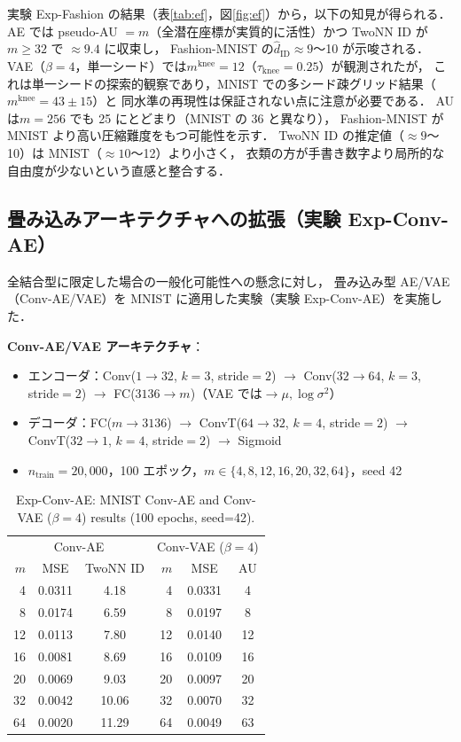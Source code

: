 \documentclass[11pt,a4paper]{jsarticle}
\newcommand{\mknee}{m^{\mathrm{knee}}}
\begin{document}
実験 Exp-Fashion の結果（表\ref{tab:ef}，図\ref{fig:ef}）から，以下の知見が得られる．
AE では pseudo-AU $= m$（全潜在座標が実質的に活性）かつ TwoNN ID が $m \geq 32$ で $\approx 9.4$ に収束し，
Fashion-MNIST の$\hat{d}_\mathrm{ID} \approx 9$〜10 が示唆される．
VAE（$\beta=4$，単一シード）では$\mknee = 12$（$\tau_{\mathrm{knee}} = 0.25$）が観測されたが，
これは単一シードの探索的観察であり，MNIST での多シード疎グリッド結果（$\mknee = 43 \pm 15$）と
同水準の再現性は保証されない点に注意が必要である．
AU は$m = 256$ でも 25 にとどまり（MNIST の 36 と異なり），
Fashion-MNIST が MNIST より高い圧縮難度をもつ可能性を示す．
TwoNN ID の推定値（$\approx 9$〜10）は MNIST（$\approx 10$〜12）より小さく，
衣類の方が手書き数字より局所的な自由度が少ないという直感と整合する．

\subsection{畳み込みアーキテクチャへの拡張（実験 Exp-Conv-AE）}\label{sec:exp_conv}

全結合型に限定した場合の一般化可能性への懸念に対し，
畳み込み型 AE/VAE（Conv-AE/VAE）を MNIST に適用した実験（実験 Exp-Conv-AE）を実施した．

\textbf{Conv-AE/VAE アーキテクチャ}：
\begin{itemize}
  \item エンコーダ：Conv($1\to32$, $k=3$, stride$=2$) $\to$ Conv($32\to64$, $k=3$, stride$=2$)
        $\to$ FC($3136\to m$)（VAE では$\to \mu, \log\sigma^2$）
  \item デコーダ：FC($m\to3136$) $\to$ ConvT($64\to32$, $k=4$, stride$=2$) $\to$
        ConvT($32\to1$, $k=4$, stride$=2$) $\to$ Sigmoid
  \item $n_{\mathrm{train}} = 20{,}000$，100 エポック，$m \in \{4, 8, 12, 16, 20, 32, 64\}$，seed 42
\end{itemize}

\begin{table}[H]
\centering
\caption{Exp-Conv-AE: MNIST Conv-AE and Conv-VAE ($\beta=4$) results (100 epochs, seed=42).}
\label{tab:eg}
\small
\begin{tabular}{rcc|rcc}
\toprule
\multicolumn{3}{c|}{Conv-AE} & \multicolumn{3}{c}{Conv-VAE ($\beta=4$)} \\
$m$ & MSE & TwoNN ID & $m$ & MSE & AU \\
\midrule
 4  & 0.0311 & 4.18  &  4  & 0.0331 &  4 \\
 8  & 0.0174 & 6.59  &  8  & 0.0197 &  8 \\
12  & 0.0113 & 7.80  & 12  & 0.0140 & 12 \\
16  & 0.0081 & 8.69  & 16  & 0.0109 & 16 \\
20  & 0.0069 & 9.03  & 20  & 0.0097 & 20 \\
32  & 0.0042 & 10.06 & 32  & 0.0070 & 32 \\
64  & 0.0020 & 11.29 & 64  & 0.0049 & 63 \\
\bottomrule
\end{tabular}
\end{table}
\end{document}
